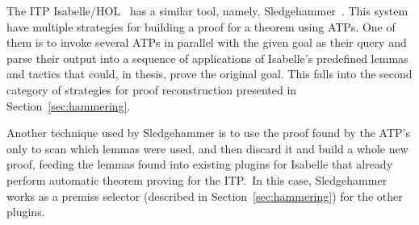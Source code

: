 The ITP Isabelle/HOL~\cite{Nipkow2002} has a similar tool,
namely, Sledgehammer~\cite{sledgehammer}. This system have multiple
strategies for building a proof for a theorem using ATPs. One of them
is to invoke several ATPs in parallel with the given goal as their query
and parse their output into a sequence of applications of Isabelle's
predefined lemmas and tactics that could, in thesis, prove the original
goal. This falls into the second category of strategies for proof
reconstruction presented in Section~\ref{sec:hammering}.

Another technique used by Sledgehammer is to use the proof found
by the ATP's only to scan which lemmas were used, and then discard
it and build a whole new proof, feeding the lemmas found into existing
plugins for Isabelle that already perform automatic theorem proving for
the ITP.\ In this case, Sledgehammer works as a premiss selector
(described in Section~\ref{sec:hammering}) for the other plugins.
